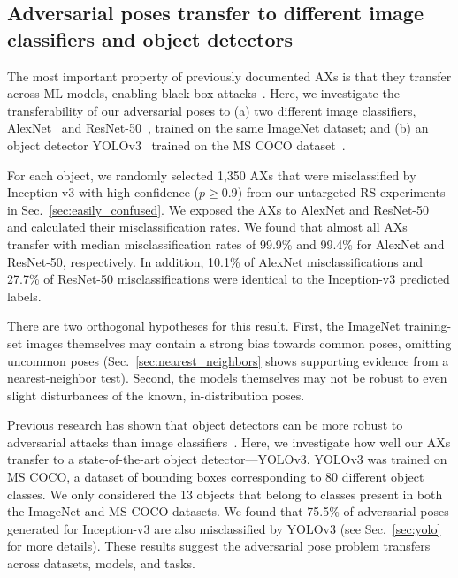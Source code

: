 \documentclass[10pt,twocolumn,letterpaper]{article}
\newcommand{\subsec}[1]{\noindent{\textbf{#1.}}}
\begin{document}
\subsection{Adversarial poses transfer to different image classifiers and object detectors}

The most important property of previously documented AXs is that they transfer across ML models, enabling black-box attacks~\cite{Yuan2017}.
Here, we investigate the transferability of our adversarial poses to (a) two different image classifiers, AlexNet~\cite{Krizhevsky2012} and ResNet-50~\cite{He2016}, trained on the same ImageNet dataset; and (b) an object detector YOLOv3~\cite{Redmon2018} trained on the MS COCO dataset~\cite{lin2014microsoft}.



For each object, we randomly selected 1,350 AXs that were misclassified by Inception-v3 with high confidence ($p \geq 0.9$) from our untargeted RS experiments in Sec.~\ref{sec:easily_confused}.
We exposed the AXs to AlexNet and ResNet-50 and calculated their misclassification rates.
We found that almost all AXs transfer with median misclassification rates of 99.9\% and 99.4\% for AlexNet and ResNet-50, respectively.
In addition, 10.1\% of AlexNet misclassifications and 27.7\% of ResNet-50 misclassifications were identical to the Inception-v3 predicted labels.

There are two orthogonal hypotheses for this result. 
First, the ImageNet training-set images themselves may contain a strong bias towards common poses, omitting uncommon poses (Sec.~\ref{sec:nearest_neighbors} shows supporting evidence from a nearest-neighbor test). 
Second, the models themselves may not be robust to even slight disturbances of the known, in-distribution poses.



\subsec{Object detectors}
Previous research has shown that object detectors can be more robust to adversarial attacks than image classifiers~\cite{lu2017-standard}.
Here, we investigate how well our AXs transfer to a state-of-the-art object detector---YOLOv3.
YOLOv3 was trained on MS COCO, a dataset of bounding boxes corresponding to 80 different object classes.
We only considered the 13 objects that belong to classes present in both the ImageNet and MS COCO datasets.
We found that 75.5\% of adversarial poses generated for Inception-v3 are also misclassified by YOLOv3 (see Sec.~\ref{sec:yolo} for more details).
These results suggest the adversarial pose problem transfers across datasets, models, and tasks.
\end{document}
